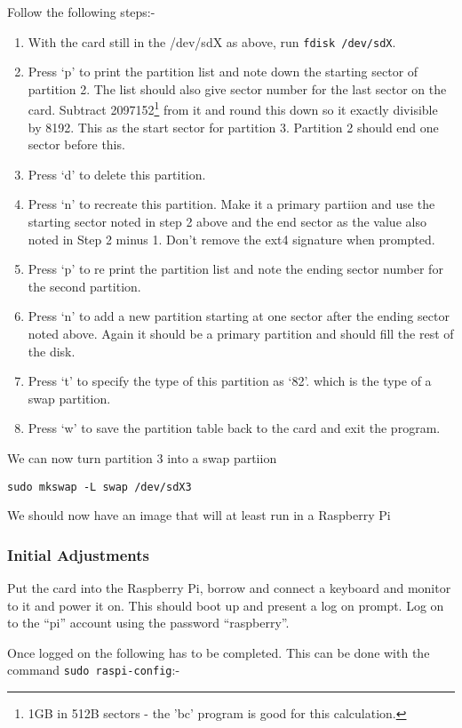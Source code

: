 \documentclass[Draft]{akc}
\begin{document}
Follow the following steps:-
\begin{enumerate}
\item With the card still in the /dev/sdX as above, run \texttt{fdisk /dev/sdX}.
\item Press `p' to print the partition list and note down the starting sector of partition 2.  The
list should also give sector number for the last sector on the card. Subtract 2097152\footnote{1GB
in 512B sectors - the 'bc' program is good for this calculation.} from it and round this down so it exactly 
divisible by 8192. This as the start sector
for partition 3. Partition 2 should end one sector before this.
\item Press `d' to delete this partition.
\item Press `n' to recreate this partition.  Make it a primary partiion and use the starting sector
noted in step 2 above and the end sector as the value also noted in Step 2 minus 1. Don't remove the
ext4 signature when prompted.
\item Press `p' to re print the partition list and note the ending sector number for the second partition.
\item Press `n' to add a new partition starting at one sector after the ending sector noted above.
Again it should be a primary partition and should fill the rest of the disk.
\item Press `t' to specify the type of this partition as `82'. which is the type of a swap partition.
\item Press `w' to save the partition table back to the card and exit the program.
\end{enumerate}

We can now turn partition 3 into a swap partiion
\begin{lstlisting}
sudo mkswap -L swap /dev/sdX3
\end{lstlisting}

We should now have an image that will at least run in a Raspberry Pi

\subsubsection{Initial Adjustments}

Put the card into the Raspberry Pi, borrow and connect a keyboard and monitor to it and power it on.  This
should boot up and present a log on prompt. Log on to the ``pi'' account using the password ``raspberry''.

Once logged on the following has to be completed. This can be done with the command \texttt{sudo
raspi-config}:-
\end{document}
